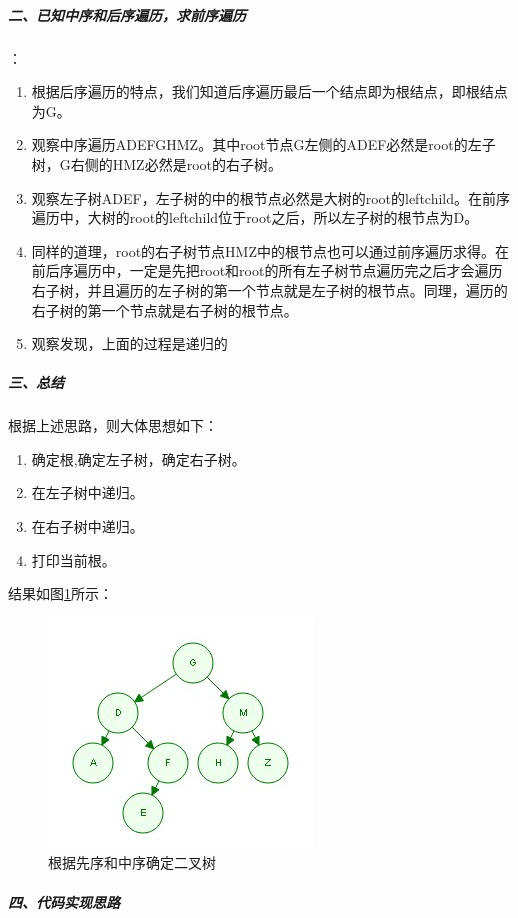 \documentclass[UTF8,a4paper,12pt]{ctexbook}
\begin{document}
		\subparagraph{二、已知中序和后序遍历，求前序遍历}：
		
			\begin{enumerate}[itemindent = 1em]
				\item 根据后序遍历的特点，我们知道后序遍历最后一个结点即为根结点，即根结点为G。
				\item 观察中序遍历ADEFGHMZ。其中root节点G左侧的ADEF必然是root的左子树，G右侧的HMZ必然是root的右子树。
				\item 观察左子树ADEF，左子树的中的根节点必然是大树的root的leftchild。在前序遍历中，大树的root的leftchild位于root之后，所以左子树的根节点为D。
				\item 同样的道理，root的右子树节点HMZ中的根节点也可以通过前序遍历求得。在前后序遍历中，一定是先把root和root的所有左子树节点遍历完之后才会遍历右子树，并且遍历的左子树的第一个节点就是左子树的根节点。同理，遍历的右子树的第一个节点就是右子树的根节点。
				\item 观察发现，上面的过程是递归的
			\end{enumerate}
		
		\subparagraph{三、总结}
			根据上述思路，则大体思想如下：
			
			\begin{enumerate}[itemindent = 1em]
				\item 确定根,确定左子树，确定右子树。
				\item 在左子树中递归。
				\item 在右子树中递归。
				\item 打印当前根。
			\end{enumerate}
			
			结果如图\ref{mid_first}所示：
				\begin{figure}
					\centering
					\includegraphics[scale = 1]{Tree_Mid_First.jpg}
					\caption{根据先序和中序确定二叉树}
					\label{mid_first}
				\end{figure}
		
		\subparagraph{四、代码实现思路}
\end{document}
